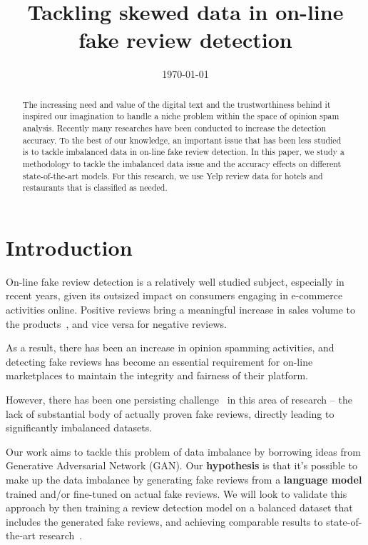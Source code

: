 \documentclass[conference]{IEEEtran} %
\title{Tackling skewed data in on-line fake review detection}
\date{\today}
\author{\IEEEauthorblockN{Satheesh Joseph}
\IEEEauthorblockA{satheeshrishi@berkeley.edu}
\and
\IEEEauthorblockN{Catherine Mou}
\IEEEauthorblockA{catherine041616@berkeley.edu}
\and
\IEEEauthorblockN{Yi Zhang}
\IEEEauthorblockA{yizhang7210@berkeley.edu}
}
\theoremstyle{plain}
\theoremstyle{definition}
\begin{document}
\maketitle



\begin{abstract}
The increasing need and value of the digital text and the trustworthiness behind it inspired our imagination to handle a niche problem within the space of opinion spam analysis. Recently many researches have been conducted to increase the detection accuracy. To the best of our knowledge, an important issue that has been less studied is to tackle imbalanced data in on-line fake review detection. In this paper, we study a methodology to tackle the imbalanced data issue and the accuracy effects on different state-of-the-art models. For this research, we use Yelp review data for hotels and restaurants that is classified as needed.
\end{abstract}

\section{Introduction}
\label{intro}
On-line fake review detection is a relatively well studied subject, especially in recent years, given its outsized impact on consumers engaging in e-commerce activities online. Positive reviews bring a meaningful increase in sales volume to the products~\cite{ho2013effects}, and vice versa for negative reviews.

As a result, there has been an increase in opinion spamming activities, and detecting fake reviews has become an essential requirement for on-line marketplaces to maintain the integrity and fairness of their platform.

However, there has been one persisting challenge~\cite{stanton2019gans, Tang2020, wang2020fake, yuan2019learning} in this area of research -- the lack of substantial body of actually proven fake reviews, directly leading to significantly imbalanced datasets.

Our work aims to tackle this problem of data imbalance by borrowing ideas from Generative Adversarial Network (GAN). Our \textbf{hypothesis} is that it's possible to make up the data imbalance by generating fake reviews from a \textbf{language model} trained and/or fine-tuned on actual fake reviews. We will look to validate this approach by then training a review detection model on a balanced dataset that includes the generated fake reviews, and achieving comparable results to state-of-the-art research~\cite{Tang2020}.
\end{document}
